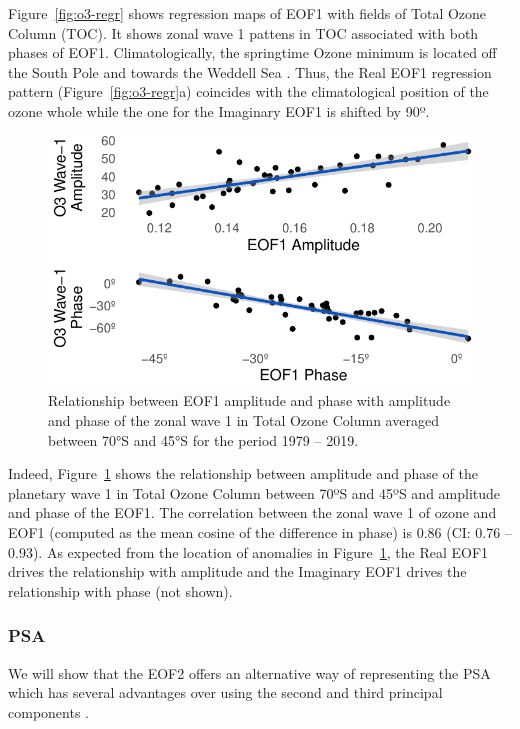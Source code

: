 \documentclass[smallextended]{svjour3}       %
\begin{document}
Figure~\ref{fig:o3-regr} shows regression maps of EOF1 with fields of Total Ozone Column (TOC). It shows zonal wave 1 pattens in TOC associated with both phases of EOF1. Climatologically, the springtime Ozone minimum is located off the South Pole and towards the Weddell Sea \citep{wirth1993}. Thus, the Real EOF1 regression pattern (Figure~\ref{fig:o3-regr}a) coincides with the climatological position of the ozone whole while the one for the Imaginary EOF1 is shifted by 90º.



\begin{figure}
\centering
\includegraphics{../figures/wave1-o3-1.pdf}
\caption{\label{fig:wave1-o3}Relationship between EOF1 amplitude and phase with amplitude and phase of the zonal wave 1 in Total Ozone Column averaged between 70°S and 45°S for the period 1979 -- 2019.}
\end{figure}

Indeed, Figure~\ref{fig:wave1-o3} shows the relationship between amplitude and phase of the planetary wave 1 in Total Ozone Column between 70ºS and 45ºS and amplitude and phase of the EOF1. The correlation between the zonal wave 1 of ozone and EOF1 (computed as the mean cosine of the difference in phase) is 0.86 (CI: 0.76 -- 0.93). As expected from the location of anomalies in Figure~\ref{fig:wave1-o3}, the Real EOF1 drives the relationship with amplitude and the Imaginary EOF1 drives the relationship with phase (not shown).

\hypertarget{psa}{%
\subsubsection{PSA}\label{psa}}

We will show that the EOF2 offers an alternative way of representing the PSA which has several advantages over using the second and third principal components .
\end{document}
